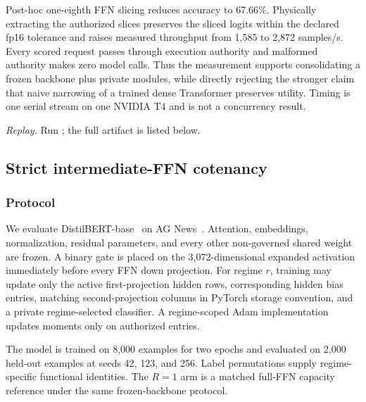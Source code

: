\documentclass[11pt]{article}
\begin{document}
Post-hoc one-eighth FFN slicing reduces accuracy to 67.66\%. Physically
extracting the authorized slices preserves the sliced logits within the
declared fp16 tolerance and raises measured throughput from 1,585 to 2,872
samples/s. Every scored request passes through execution authority and malformed
authority makes zero model calls. Thus the measurement supports consolidating
a frozen backbone plus private modules, while directly rejecting the stronger
claim that naive narrowing of a trained dense Transformer preserves utility.
Timing is one serial stream on one NVIDIA T4 and is not a concurrency result.

\noindent\textit{Replay.} Run
; the full artifact
is listed below.
\par\smallskip{}
\par

\subsection{Strict intermediate-FFN cotenancy}

\subsubsection{Protocol}

We evaluate DistilBERT-base~\citep{sanh2019distilbert} on AG
News~\citep{zhang2015agnews}. Attention, embeddings, normalization, residual
parameters, and every other non-governed shared weight are frozen. A binary gate
is placed on the 3,072-dimensional expanded activation immediately before every
FFN down projection. For regime $r$, training may update only the active
first-projection hidden rows, corresponding hidden bias entries, matching
second-projection columns in PyTorch storage convention, and a private
regime-selected classifier. A regime-scoped Adam implementation updates moments
only on authorized entries.

The model is trained on 8,000 examples for two epochs and evaluated on 2,000
held-out examples at seeds 42, 123, and 256. Label permutations supply
regime-specific functional identities. The $R=1$ arm is a matched full-FFN
capacity reference under the same frozen-backbone protocol.
\end{document}
